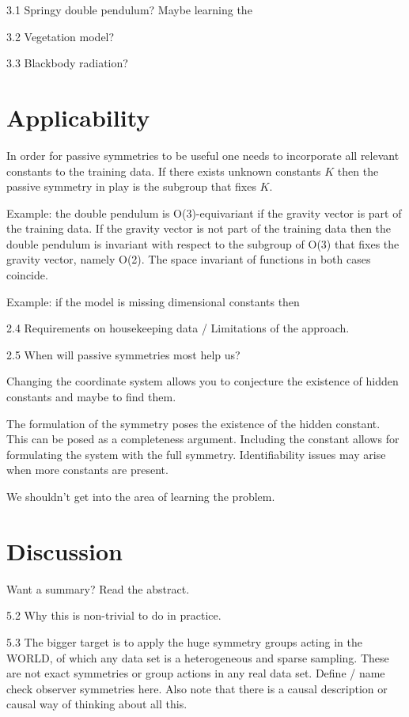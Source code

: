 \documentclass{article}
\theoremstyle{plain}
\theoremstyle{definition}
\theoremstyle{remark}
\begin{document}
   3.1 Springy double pendulum? Maybe learning the 
   
   3.2 Vegetation model?
   
   3.3 Blackbody radiation?

\section{Applicability}\label{sec:applicability}

In order for passive symmetries to be useful one needs to incorporate all relevant constants to the training data. If there exists unknown constants $K$ then the passive symmetry in play is the subgroup that fixes $K$.

Example: the double pendulum is O(3)-equivariant if the gravity vector is part of the training data. If the gravity vector is not part of the training data then the double pendulum is invariant with respect to the subgroup of O(3) that fixes the gravity vector, namely O(2). The space invariant of functions in both cases coincide.

Example: if the model is missing dimensional constants then 

   2.4 Requirements on housekeeping data / Limitations of the approach.

   2.5 When will passive symmetries most help us?
   
   Changing the coordinate system allows you to conjecture the existence of hidden constants and maybe to find them. 
   
   The formulation of the symmetry poses the existence of the hidden constant. This can be posed as a completeness argument. Including the constant allows for formulating the system with the full symmetry.
   Identifiability issues may arise when more constants are present.
   
   We shouldn't get into the area of learning the problem. 





\section{Discussion}\label{sec:summary}

Want a summary? Read the abstract.

   5.2 Why this is non-trivial to do in practice.
   
   5.3 The bigger target is to apply the huge symmetry groups acting in the WORLD, of which any data set is a heterogeneous and sparse sampling. These are not exact symmetries or group actions in any real data set. Define / name check observer symmetries here. Also note that there is a causal description or causal way of thinking about all this.
\end{document}
